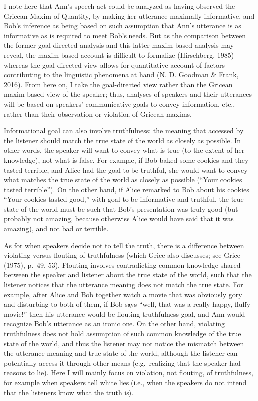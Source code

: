 \documentclass[oneside]{report}
\begin{document}
I note here that Ann's speech act could be analyzed as having observed
the Gricean Maxim of Quantity, by making her utterance maximally
informative, and Bob's inference as being based on such assumption that
Ann's utterance is as informative as is required to meet Bob's needs.
But as the comparison between the former goal-directed analysis and this
latter maxim-based analysis may reveal, the maxim-based account is
difficult to formalize (Hirschberg, 1985) whereas the goal-directed view
allows for quantitative account of factors contributing to the
linguistic phenomena at hand (N. D. Goodman \& Frank, 2016). From here
on, I take the goal-directed view rather than the Gricean maxim-based
view of the speaker; thus, analyses of speakers and their utterances
will be based on speakers' communicative goals to convey information,
etc., rather than their observation or violation of Gricean maxims.

Informational goal can also involve truthfulness: the meaning that
accessed by the listener should match the true state of the world as
closely as possible. In other words, the speaker will want to convey
what is true (to the extent of her knowledge), not what is false. For
example, if Bob baked some cookies and they tasted terrible, and Alice
had the goal to be truthful, she would want to convey what matches the
true state of the world as closely as possible (``Your cookies tasted
terrible''). On the other hand, if Alice remarked to Bob about his
cookies ``Your cookies tasted good,'' with goal to be informative and
truthful, the true state of the world must be such that Bob's
presentation was truly good (but probably not amazing, because otherwise
Alice would have said that it was amazing), and not bad or terrible.

As for when speakers decide not to tell the truth, there is a difference
between violating versus flouting of truthfulness (which Grice also
discusses; see Grice (1975), p.~49, 53). Flouting involves contradicting
common knowledge shared between the speaker and listener about the true
state of the world, such that the listener notices that the utterance
meaning does not match the true state. For example, after Alice and Bob
together watch a movie that was obviously gory and disturbing to both of
them, if Bob says ``well, that was a really happy, fluffy movie!'' then
his utterance would be flouting truthfulness goal, and Ann would
recognize Bob's utterance as an ironic one. On the other hand, violating
truthfulness does not hold assumption of such common knowledge of the
true state of the world, and thus the listener may not notice the
mismatch between the utterance meaning and true state of the world,
although the listener can potentially access it through other means
(e.g.~realizing that the speaker had reasons to lie). Here I will mainly
focus on violation, not flouting, of truthfulness, for example when
speakers tell white lies (i.e., when the speakers do not intend that the
listeners know what the truth is).
\end{document}
